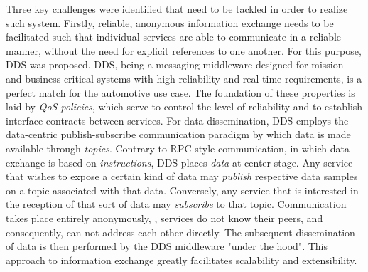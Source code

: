 Three key challenges were identified that need to be tackled in order to realize such system. Firstly, reliable, anonymous information exchange needs to be facilitated such that individual services are able to communicate in a reliable manner, without the need for explicit references to one another. For this purpose, DDS was proposed. DDS, being a messaging middleware designed for mission- and business critical systems with high reliability and real-time requirements, is a perfect match for the automotive use case.
The foundation of these properties is laid by \emph{QoS policies}, which serve to control the level of reliability and to establish interface contracts between services. For data dissemination, DDS employs the data-centric publish-subscribe communication paradigm by which data is made available through \emph{topics}. Contrary to RPC-style communication, in which data exchange is based on \emph{instructions}, DDS places \emph{data} at center-stage. Any service that wishes to expose a certain kind of data may \emph{publish} respective data samples on a topic associated with that data. Conversely, any service that is interested in the reception of that sort of data may \emph{subscribe} to that topic. Communication takes place entirely anonymously, \ie, services do not know their peers, and consequently, can not address each other directly. The subsequent dissemination of data is then performed by the DDS middleware "under the hood". This approach to information exchange greatly facilitates scalability and extensibility.

